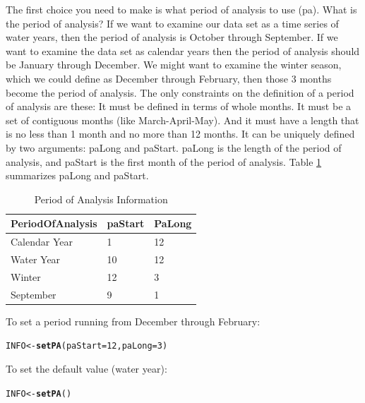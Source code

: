 \documentclass[a4paper,11pt]{article}\usepackage{graphicx, color}
\makeatletter
\newcommand{\hlfunctioncall}[1]{\textcolor[rgb]{0.501960784313725,0,0.329411764705882}{\textbf{#1}}}%
\newenvironment{kframe}{%
 \def\at@end@of@kframe{}%
 \ifinner\ifhmode%
  \def\at@end@of@kframe{\end{minipage}}%
  \begin{minipage}{\columnwidth}%
 \fi\fi%
 \def\FrameCommand##1{\hskip\@totalleftmargin \hskip-\fboxsep
 \colorbox{shadecolor}{##1}\hskip-\fboxsep
     \hskip-\linewidth \hskip-\@totalleftmargin \hskip\columnwidth}%
 \MakeFramed {\advance\hsize-\width
   \@totalleftmargin\z@ \linewidth\hsize
   \@setminipage}}%
 {\par\unskip\endMakeFramed%
 \at@end@of@kframe}
\newenvironment{knitrout}{}{} %
\makeatother
\begin{document}
The first choice you need to make is what period of analysis to use (pa). What is the period of analysis?  If we want to examine our data set as a time series of water years, then the period of analysis is October through September.  If we want to examine the data set as calendar years then the period of analysis should be January through December.  We might want to examine the winter season, which we could define as December through February, then those 3 months become the period of analysis. The only constraints on the definition of a period of analysis are these: It must be defined in terms of whole months.  It must be a set of contiguous months (like March-April-May).  And it must have a length that is no less than 1 month and no more than 12 months.  It can be uniquely defined by two arguments: paLong and paStart.  paLong is the length of the period of analysis, and paStart is the first month of the period of analysis. Table \ref{table:paINFO} summarizes paLong and paStart.

\begin{table}[!ht]
\centering
\caption{Period of Analysis Information} 
\label{table:paINFO}
\begin{tabular}{lll}
  \hline
PeriodOfAnalysis & paStart & PaLong \\ 
  \hline
Calendar Year & 1 & 12 \\ 
  Water Year & 10 & 12 \\ 
  Winter & 12 & 3 \\ 
  September & 9 & 1 \\ 
   \hline
\end{tabular}
\end{table}

To set a period running from December through February:
\begin{knitrout}
\color{fgcolor}\begin{kframe}
\begin{alltt}
INFO <- \hlfunctioncall{setPA}(paStart=12,paLong=3)
\end{alltt}
\end{kframe}
\end{knitrout}


To set the default value (water year):
\begin{knitrout}
\color{fgcolor}\begin{kframe}
\begin{alltt}
INFO <- \hlfunctioncall{setPA}()
\end{alltt}
\end{kframe}
\end{knitrout}
\end{document}
